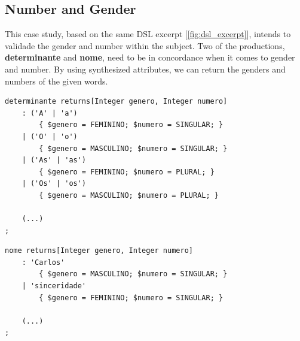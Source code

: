 
\subsection{Number and Gender}
This case study, based on the same \textsc{DSL} excerpt [\ref{fig:dsl_excerpt}], intends to validade the gender and number within the subject. Two of the productions, \textbf{determinante} and \textbf{nome}, need to be in concordance when it comes to gender and number. By using synthesized attributes, we can return the genders and numbers of the given words.

\begin{center}
\begin{minipage}{11cm}
\begin{Verbatim}[frame=single, framesep=2mm, fontsize=\small]
determinante returns[Integer genero, Integer numero]
    : ('A' | 'a')
        { $genero = FEMININO; $numero = SINGULAR; }
    | ('O' | 'o')
        { $genero = MASCULINO; $numero = SINGULAR; }
    | ('As' | 'as')
        { $genero = FEMININO; $numero = PLURAL; }
    | ('Os' | 'os')
        { $genero = MASCULINO; $numero = PLURAL; }

    (...)
;
\end{Verbatim}
\end{minipage}
\end{center}


\begin{center}
\begin{minipage}{11cm}
\begin{Verbatim}[frame=single, framesep=2mm, fontsize=\small]
nome returns[Integer genero, Integer numero]
    : 'Carlos'
        { $genero = MASCULINO; $numero = SINGULAR; }
    | 'sinceridade'
        { $genero = FEMININO; $numero = SINGULAR; }
    
    (...)
;
\end{Verbatim}
\end{minipage}
\end{center}

